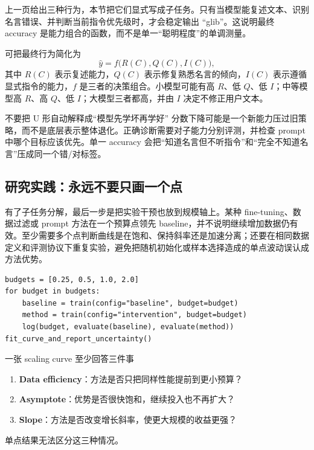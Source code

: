 上一页给出三种行为，本节把它们显式写成子任务。只有当模型能复述文本、识别名言错误、并判断当前指令优先级时，才会稳定输出 ``glib''。这说明最终 accuracy 是能力组合的函数，而不是单一“聪明程度”的单调测量。


可把最终行为简化为
\[
\hat{y}=f\bigl(R(C),Q(C),I(C)\bigr),
\]
其中 $R(C)$ 表示复述能力，$Q(C)$ 表示修复熟悉名言的倾向，$I(C)$ 表示遵循显式指令的能力，$f$ 是三者的决策组合。小模型可能有高 $R$、低 $Q$、低 $I$；中等模型高 $R$、高 $Q$、低 $I$；大模型三者都高，并由 $I$ 决定不修正用户文本。

\begin{warningbox}{不要把 U 形自动解释成“模型先学坏再学好”}
分数下降可能是一个新能力压过旧策略，而不是底层表示整体退化。正确诊断需要对子能力分别评测，并检查 prompt 中哪个目标应该优先。单一 accuracy 会把“知道名言但不听指令”和“完全不知道名言”压成同一个错/对标签。
\end{warningbox}


\subsection{研究实践：永远不要只画一个点}

有了子任务分解，最后一步是把实验干预也放到规模轴上。某种 fine-tuning、数据过滤或 prompt 方法在一个预算点领先 baseline，并不说明继续增加数据仍有效。至少需要多个点判断曲线是在饱和、保持斜率还是加速分离；还要在相同数据定义和评测协议下重复实验，避免把随机初始化或样本选择造成的单点波动误认成方法优势。


\begin{lstlisting}[caption={比较研究干预与 baseline 的 scaling curve}]
budgets = [0.25, 0.5, 1.0, 2.0]
for budget in budgets:
    baseline = train(config="baseline", budget=budget)
    method = train(config="intervention", budget=budget)
    log(budget, evaluate(baseline), evaluate(method))
fit_curve_and_report_uncertainty()
\end{lstlisting}

\begin{importantbox}{一张 scaling curve 至少回答三件事}
\begin{enumerate}
  \item \textbf{Data efficiency}：方法是否只把同样性能提前到更小预算？
  \item \textbf{Asymptote}：优势是否很快饱和，继续投入也不再扩大？
  \item \textbf{Slope}：方法是否改变增长斜率，使更大规模的收益更强？
\end{enumerate}
单点结果无法区分这三种情况。
\end{importantbox}

